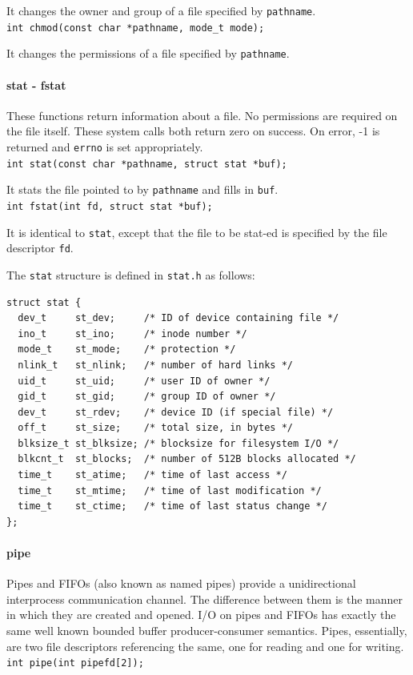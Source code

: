 It changes the owner and group of a file specified by \texttt{pathname}.
\\
\texttt{int chmod(const char *pathname, mode\_t mode);}

It changes the permissions of a file specified by \texttt{pathname}.

\paragraph{stat - fstat}
These functions return information about a file. No permissions are required on the file itself. These system calls both return zero on success. On error, -1 is returned and \texttt{errno} is set appropriately.
\\
\texttt{int stat(const char *pathname, struct stat *buf);}

It stats the file pointed to by \texttt{pathname} and fills in \texttt{buf}.
\\
\texttt{int fstat(int fd, struct stat *buf);}

It is identical to \texttt{stat}, except that the file to be stat-ed is specified by the file descriptor \texttt{fd}.

The \texttt{stat} structure is defined in \texttt{stat.h} as follows:
\begin{verbatim}
struct stat {
  dev_t     st_dev;     /* ID of device containing file */
  ino_t     st_ino;     /* inode number */
  mode_t    st_mode;    /* protection */
  nlink_t   st_nlink;   /* number of hard links */
  uid_t     st_uid;     /* user ID of owner */
  gid_t     st_gid;     /* group ID of owner */
  dev_t     st_rdev;    /* device ID (if special file) */
  off_t     st_size;    /* total size, in bytes */
  blksize_t st_blksize; /* blocksize for filesystem I/O */
  blkcnt_t  st_blocks;  /* number of 512B blocks allocated */
  time_t    st_atime;   /* time of last access */
  time_t    st_mtime;   /* time of last modification */
  time_t    st_ctime;   /* time of last status change */
};
\end{verbatim}

\paragraph{pipe}
Pipes and FIFOs (also known as named pipes) provide a unidirectional interprocess communication channel. The difference between them is the manner in which they are created and opened. I/O on pipes and FIFOs has exactly the same well known bounded buffer producer-consumer semantics. Pipes, essentially, are two file descriptors referencing the same, one for reading and one for writing.
\\
\texttt{int pipe(int pipefd[2]);}


